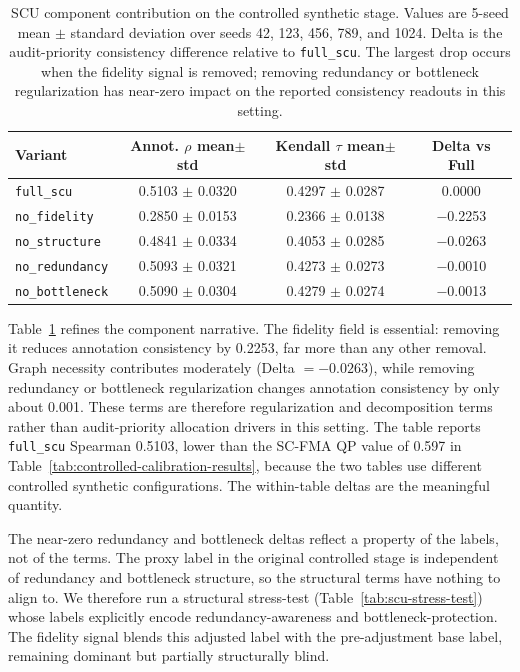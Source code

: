 \documentclass[a4paper,fleqn]{cas-sc}
\begin{document}
\begin{table}[ht]
\caption{SCU component contribution on the controlled synthetic stage. Values are 5-seed mean $\pm$ standard deviation over seeds 42, 123, 456, 789, and 1024. Delta is the audit-priority consistency difference relative to \texttt{full\_scu}. The largest drop occurs when the fidelity signal is removed; removing redundancy or bottleneck regularization has near-zero impact on the reported consistency readouts in this setting.}
\label{tab:scu-component-contribution}
\centering
\small
\renewcommand{\arraystretch}{1.08}
\begin{tabular}{lccc}
\toprule
\textbf{Variant} & \textbf{Annot. $\rho$ mean$\pm$std} & \textbf{Kendall $\tau$ mean$\pm$std} & \textbf{Delta vs Full} \\
\midrule
\texttt{full\_scu} & 0.5103 $\pm$ 0.0320 & 0.4297 $\pm$ 0.0287 & 0.0000 \\
\texttt{no\_fidelity} & 0.2850 $\pm$ 0.0153 & 0.2366 $\pm$ 0.0138 & $-$0.2253 \\
\texttt{no\_structure} & 0.4841 $\pm$ 0.0334 & 0.4053 $\pm$ 0.0285 & $-$0.0263 \\
\texttt{no\_redundancy} & 0.5093 $\pm$ 0.0321 & 0.4273 $\pm$ 0.0273 & $-$0.0010 \\
\texttt{no\_bottleneck} & 0.5090 $\pm$ 0.0304 & 0.4279 $\pm$ 0.0274 & $-$0.0013 \\
\bottomrule
\end{tabular}
\end{table}

Table~\ref{tab:scu-component-contribution} refines the component narrative. The fidelity field is essential: removing it reduces annotation consistency by 0.2253, far more than any other removal. Graph necessity contributes moderately (Delta $=-0.0263$), while removing redundancy or bottleneck regularization changes annotation consistency by only about 0.001. These terms are therefore regularization and decomposition terms rather than audit-priority allocation drivers in this setting. The table reports \texttt{full\_scu} Spearman 0.5103, lower than the SC-FMA QP value of 0.597 in Table~\ref{tab:controlled-calibration-results}, because the two tables use different controlled synthetic configurations. The within-table deltas are the meaningful quantity.

The near-zero redundancy and bottleneck deltas reflect a property of the labels, not of the terms. The proxy label in the original controlled stage is independent of redundancy and bottleneck structure, so the structural terms have nothing to align to. We therefore run a structural stress-test (Table~\ref{tab:scu-stress-test}) whose labels explicitly encode redundancy-awareness and bottleneck-protection. The fidelity signal blends this adjusted label with the pre-adjustment base label, remaining dominant but partially structurally blind.
\end{document}
